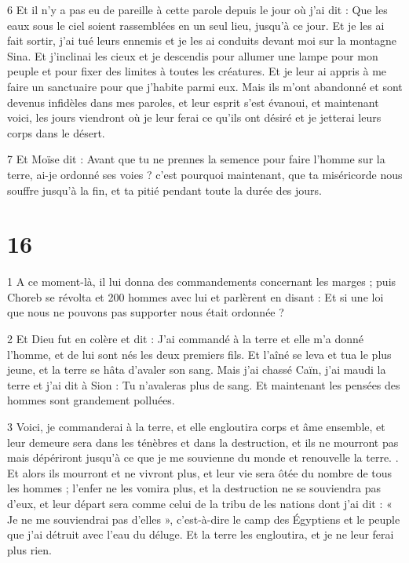 \par 6 Et il n'y a pas eu de pareille à cette parole depuis le jour où j'ai dit : Que les eaux sous le ciel soient rassemblées en un seul lieu, jusqu'à ce jour. Et je les ai fait sortir, j'ai tué leurs ennemis et je les ai conduits devant moi sur la montagne Sina. Et j'inclinai les cieux et je descendis pour allumer une lampe pour mon peuple et pour fixer des limites à toutes les créatures. Et je leur ai appris à me faire un sanctuaire pour que j'habite parmi eux. Mais ils m'ont abandonné et sont devenus infidèles dans mes paroles, et leur esprit s'est évanoui, et maintenant voici, les jours viendront où je leur ferai ce qu'ils ont désiré et je jetterai leurs corps dans le désert.

\par 7 Et Moïse dit : Avant que tu ne prennes la semence pour faire l'homme sur la terre, ai-je ordonné ses voies ? c'est pourquoi maintenant, que ta miséricorde nous souffre jusqu'à la fin, et ta pitié pendant toute la durée des jours.

\chapter{16}

\par 1 A ce moment-là, il lui donna des commandements concernant les marges ; puis Choreb se révolta et 200 hommes avec lui et parlèrent en disant : Et si une loi que nous ne pouvons pas supporter nous était ordonnée ?

\par 2 Et Dieu fut en colère et dit : J'ai commandé à la terre et elle m'a donné l'homme, et de lui sont nés les deux premiers fils. Et l'aîné se leva et tua le plus jeune, et la terre se hâta d'avaler son sang. Mais j'ai chassé Caïn, j'ai maudi la terre et j'ai dit à Sion : Tu n'avaleras plus de sang. Et maintenant les pensées des hommes sont grandement polluées.

\par 3 Voici, je commanderai à la terre, et elle engloutira corps et âme ensemble, et leur demeure sera dans les ténèbres et dans la destruction, et ils ne mourront pas mais dépériront jusqu'à ce que je me souvienne du monde et renouvelle la terre. . Et alors ils mourront et ne vivront plus, et leur vie sera ôtée du nombre de tous les hommes ; l’enfer ne les vomira plus, et la destruction ne se souviendra pas d’eux, et leur départ sera comme celui de la tribu de les nations dont j'ai dit : « Je ne me souviendrai pas d'elles », c'est-à-dire le camp des Égyptiens et le peuple que j'ai détruit avec l'eau du déluge. Et la terre les engloutira, et je ne leur ferai plus rien.

